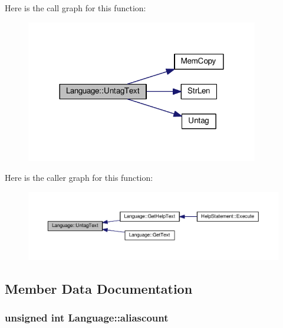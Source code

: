 Here is the call graph for this function\+:
\nopagebreak
\begin{figure}[H]
\begin{center}
\leavevmode
\includegraphics[width=288pt]{d0/d41/classLanguage_a69c5b3269ec8570a2f8f28e8e632cf44_cgraph}
\end{center}
\end{figure}




Here is the caller graph for this function\+:
\nopagebreak
\begin{figure}[H]
\begin{center}
\leavevmode
\includegraphics[width=350pt]{d0/d41/classLanguage_a69c5b3269ec8570a2f8f28e8e632cf44_icgraph}
\end{center}
\end{figure}




\subsection{Member Data Documentation}
\subsubsection[{\texorpdfstring{aliascount}{aliascount}}]{\setlength{\rightskip}{0pt plus 5cm}unsigned int Language\+::aliascount\hspace{0.3cm}{\ttfamily [protected]}}\hypertarget{classLanguage_ac7bd12392a659fa797e123a0d84414e5}{}\label{classLanguage_ac7bd12392a659fa797e123a0d84414e5}


